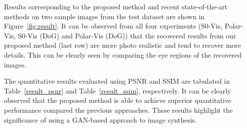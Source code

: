 \documentclass[10pt,twocolumn,letterpaper]{article}
\begin{document}
Results corresponding to the proposed method and recent state-of-the-art methods  on two sample images from the test dataset are shown in Figure~\ref{fig:result}. It can be observed from all four experiments (S0-Vis, Polar-Vis, S0-Vis (DoG) and Polar-Vis (DoG)) that the recovered results from our proposed method (last row) are more photo realistic and tend to recover more details. This can be clearly seen by comparing the eye regions of the recovered images. 


The quantitative results evaluated using PSNR and SSIM are tabulated in Table~\ref{result_psnr} and Table~\ref{result_ssim}, respectively.  It
can be clearly observed that the proposed method is able to achieve superior quantitative performance compared the previous approaches.  These results highlight the significance of using a GAN-based approach to image synthesis.  

\begin{table}[htp!]
\centering
\caption{The average PSNR (dB) results corresponding to different methods.}
\label{result_psnr}
\end{table}

\begin{table}[htp!]
\centering
\caption{The average SSIM results corresponding to different methods.}
\label{result_ssim}
\end{table}
\end{document}
